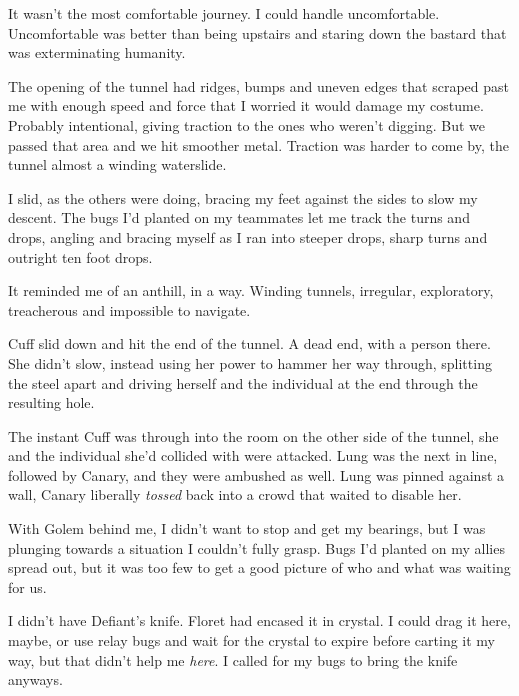 





It wasn't the most comfortable journey.  I could handle uncomfortable.  Uncomfortable was better than being upstairs and staring down the bastard that was exterminating humanity.



The opening of the tunnel had ridges, bumps and uneven edges that scraped past me with enough speed and force that I worried it would damage my costume.  Probably intentional, giving traction to the ones who weren't digging.  But we passed that area and we hit smoother metal.  Traction was harder to come by, the tunnel almost a winding waterslide.



I slid, as the others were doing, bracing my feet against the sides to slow my descent.  The bugs I'd planted on my teammates let me track the turns and drops, angling and bracing myself as I ran into steeper drops, sharp turns and outright ten foot drops.



It reminded me of an anthill, in a way.  Winding tunnels, irregular, exploratory, treacherous and impossible to navigate.



Cuff slid down and hit the end of the tunnel.  A dead end, with a person there.  She didn't slow, instead using her power to hammer her way through, splitting the steel apart and driving herself and the individual at the end through the resulting hole.



The instant Cuff was through into the room on the other side of the tunnel, she and the individual she'd collided with were attacked.  Lung was the next in line, followed by Canary, and they were ambushed as well.  Lung was pinned against a wall, Canary liberally \emph{tossed} back into a crowd that waited to disable her.



With Golem behind me, I didn't want to stop and get my bearings, but I was plunging towards a situation I couldn't fully grasp.  Bugs I'd planted on my allies spread out, but it was too few to get a good picture of who and what was waiting for us.



I didn't have Defiant's knife.  Floret had encased it in crystal.  I could drag it here, maybe, or use relay bugs and wait for the crystal to expire before carting it my way, but that didn't help me \emph{here}.  I called for my bugs to bring the knife anyways.



